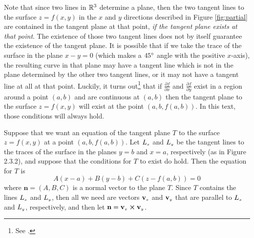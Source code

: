 Note that since two lines in $\mathbb{R}^{3}$ determine a plane, then the two tangent lines to the surface $z=f(x,y)$ in the
$x$ and $y$ directions described in Figure \ref{fig:partial} are contained in the tangent plane at that point, \emph{if
the tangent plane exists at that point}.
The existence of those two tangent lines does not by itself guarantee the
existence of the tangent plane. It is possible that if we take the trace of the surface in the plane $x-y=0$ (which
makes a $45^\circ$ angle with the positive $x$-axis), the resulting curve in that plane may have a tangent line
which is not in the plane determined by the other two tangent lines, or it may not have a tangent line at all at that
point. Luckily, it turns out\footnote{See \cite[\S\,6.4]{tm}.} that if $\frac{\partial f}{\partial x}$ and
$\frac{\partial f}{\partial y}$ exist in a region around a point $(a,b)$ and are continuous at $(a,b)$ then the
tangent plane to the surface $z=f(x,y)$ will exist at the point $(a,b,f(a,b))$. In this text, those conditions will
always hold.

Suppose that we want an equation of the tangent plane $T$ to the surface $z=f(x,y)$ at a point $(a,b,f(a,b))$.
Let $L_{\scriptscriptstyle x}$ and $L_{\scriptscriptstyle y}$ be the tangent lines to the traces of the surface in the planes $y=b$ and $x=a$,
respectively (as in Figure 2.3.2), and suppose that the conditions for $T$ to exist do hold. Then the
equation for $T$ is
\begin{equation}
 A(x-a)+B(y-b)+C(z-f(a,b))=0
\end{equation}
where $\textbf{n}=(A,B,C)$ is a normal vector to the plane $T$. Since $T$ contains the lines $L_{\scriptscriptstyle x}$ and
$L_{\scriptscriptstyle y}$, then all we need are vectors $\textbf{v}_{\scriptscriptstyle x}$ and $\textbf{v}_{\scriptscriptstyle y}$ that are parallel to
$L_{\scriptscriptstyle x}$ and
$L_{\scriptscriptstyle y}$, respectively, and then let $\textbf{n}=\textbf{v}_{\scriptscriptstyle x} \bm{\times} \textbf{v}_{\scriptscriptstyle y}$.

